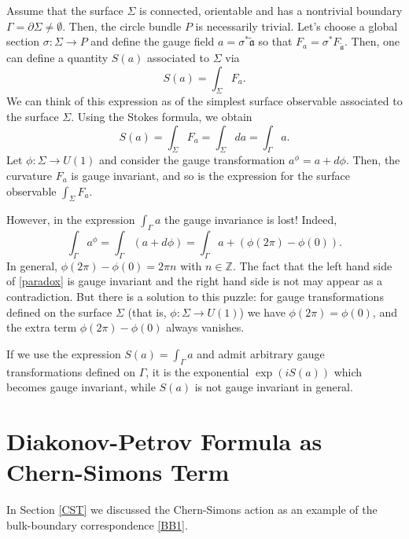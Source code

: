 \documentclass[11pt]{report}
\theoremstyle{plain}
\theoremstyle{definition}
\theoremstyle{remark}
\theoremstyle{remark}
\numberwithin{equation}{section}
\begin{document}
Assume that the surface $\Sigma$ is connected, orientable and has a nontrivial boundary $\Gamma= \partial \Sigma \neq \emptyset$. Then, the circle bundle $P$ is necessarily trivial. Let's choose a global section $\sigma: \Sigma \to P$ and define the gauge field $a = \sigma^* \mathfrak{\tilde{a}}$ so that $F_a = \sigma^* F_\mathfrak{\tilde{a}}$. %
Then, one can define a  quantity $S(a)$ associated to $\Sigma$ via
%
$$
S(a)= \int_\Sigma F_a.
$$
We can think of this expression as of the simplest surface observable associated to the surface $\Sigma$. Using the Stokes formula, we obtain
%
\begin{equation}  \label{paradox}
S(a)= \int_\Sigma  F_a = \int_\Sigma da = \int_{\Gamma} a.
\end{equation}
Let $\phi: \Sigma \to U(1)$ and consider the gauge transformation $a^\phi=a+d\phi$. Then, the curvature $F_a$ is gauge invariant, and so is the expression for the surface observable $\int_\Sigma F_a$.  

However, in the expression $\int_\Gamma a$ the gauge invariance is lost! Indeed,
%
$$
\int_\Gamma a^\phi = \int_\Gamma (a + d\phi) = \int_\Gamma a + \left( \phi(2\pi) - \phi(0) \right).
$$
In general, $\phi(2\pi) - \phi(0) = 2\pi n$ with $n \in \mathbb{Z}$. The fact that the left hand side of \eqref{paradox} is gauge invariant and the right hand side is not may appear as a contradiction. But there is a solution to this puzzle: for gauge transformations defined on the surface $\Sigma$ (that is, $\phi: \Sigma \to U(1)$) we have $\phi(2\pi) = \phi(0)$, and the extra term $\phi(2\pi) - \phi(0)$ always vanishes.

If we use the expression $S(a)=\int_\Gamma a$ and admit arbitrary gauge transformations defined on $\Gamma$, it is the exponential $\exp(iS(a))$ which becomes gauge invariant, while $S(a)$ is not gauge invariant in general.

\section{Diakonov-Petrov Formula as Chern-Simons Term}



In Section \ref{CST} we discussed the Chern-Simons action  as an example of the bulk-boundary correspondence \eqref{BB1}.
\end{document}
